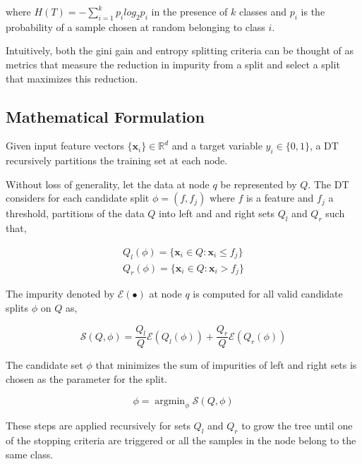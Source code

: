 \documentclass[a4paper,twoside]{report}
\DeclareMathOperator{\argmin}{argmin}
\begin{document}
where $H(T) = -\sum_{i=1}^{k}p_{i}log_{2}p_{i}$ in the presence of $k$ classes and $p_{i}$ is the probability of a sample chosen at random belonging to class $i$. 

Intuitively, both the gini gain and entropy splitting criteria can be thought of as metrics that measure the reduction in impurity from a split and select a split that maximizes this reduction. 

\subsection{Mathematical Formulation}

Given input feature vectors $\{\textbf{x}_{i}\} \in \mathbb{R}^d$ and a target variable $y_{i} \in \{0,1\}$, a DT recursively partitions the training set at each node. 

Without loss of generality, let the data at node $q$ be represented by $Q$. The DT considers for each candidate split $\phi = (f,f_{j})$ where $f$ is a feature and $f_{j}$ a threshold, partitions of the data $Q$ into left and and right sets $Q_{l}$ and $Q_{r}$ such that,

\begin{gather*}
Q_{l}(\phi) = \{\textbf{x}_{i} \in Q : \textbf{x}_{i} \leqslant f_{j}\} \\
Q_{r}(\phi) = \{\textbf{x}_{i} \in Q : \textbf{x}_{i}> f_{j}\}
\end{gather*}

The impurity denoted by $\mathcal{E}(\bullet)$ at node $q$ is computed for all valid candidate splits $\phi$ on $Q$ as, 

\begin{equation}
\mathcal{S}(Q,\phi) = \dfrac{Q_{l}}{Q}\mathcal{E}(Q_{l}(\phi)) + \dfrac{Q_{r}}{Q}\mathcal{E}(Q_{r}(\phi)) 
\end{equation}

The candidate set $\phi$ that minimizes the sum of impurities of left and right sets is chosen as the parameter for the split.

\begin{equation}
\phi = \argmin_{\phi}\mathcal{S}(Q,\phi)
\end{equation}

These steps are applied recursively for sets $Q_{l}$ and $Q_{r}$ to grow the tree until one of the stopping criteria are triggered or all the samples in the node belong to the same class. 
\end{document}
